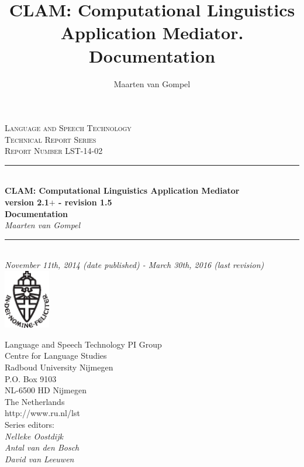 \documentclass[a4paper,12pt,twoside,openright]{report}
\author{Maarten van Gompel}
\title{CLAM: Computational Linguistics Application Mediator. Documentation}
\newcommand{\HRule}{\rule{\linewidth}{0.5mm}} %
\begin{document}
\sffamily

\begin{titlepage}
\begin{center}
\textsc{\large Language and Speech Technology\\ Technical Report Series}\\[1.5cm] 
\textsc{Report Number LST-14-02}\\[0.5cm] 

\HRule \\[0.5cm]
{ \Large \bfseries CLAM: Computational Linguistics Application Mediator}\\[0.5cm] %
{\bf \small version 2.1$+$ - revision 1.5} \\[0.5cm]
{ \Large \bfseries Documentation}\\[0.5cm]
{\large \emph{Maarten van Gompel}}\\[0.5cm]
\HRule \\[1.0cm]

\emph{November 11th, 2014 (date published) - March 30th, 2016 (last revision)} \\[0.5cm] 
\includegraphics[width=20.0mm]{ru-beeldmerk-zwart.eps}
\end{center}

\begin{minipage}{0.6\textwidth}
\begin{flushleft}
Language and Speech Technology PI Group \\
Centre for Language Studies \\
Radboud University Nijmegen \\
P.O. Box 9103 \\
NL-6500 HD Nijmegen \\
The Netherlands \\
http://www.ru.nl/lst \\[0.3cm]
Series editors: \\
\hspace{0.5cm}\emph{Nelleke Oostdijk}   \\
\hspace{0.5cm}\emph{Antal van den Bosch}  \\
\hspace{0.5cm}\emph{David van Leeuwen}  \\
\end{flushleft}
\end{minipage}

\end{titlepage}
\tableofcontents
\end{document}
